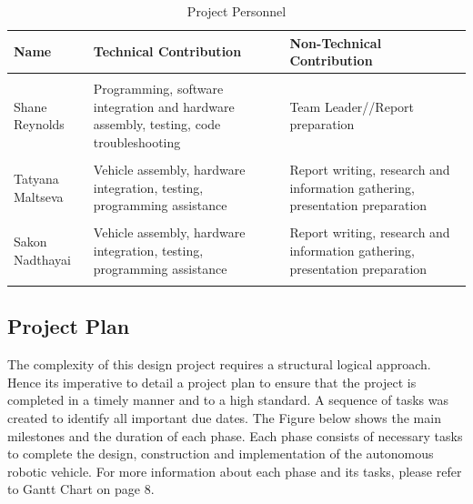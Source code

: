\documentclass[a4paper]{article}
\begin{document}
\begin{table}[h]
\centering
\caption{Project Personnel}
\small\begin{tabular}{lp{5cm}p{5cm}}
\toprule
\textbf{Name} & \textbf{Technical Contribution} & \textbf{Non-Technical Contribution}\\
\midrule
 & & \\
Shane Reynolds & Programming, software integration and hardware assembly, testing, code troubleshooting & Team Leader//Report preparation\\
 & & \\
Tatyana Maltseva & Vehicle assembly, hardware integration, testing, programming assistance & Report writing, research and information gathering, presentation preparation\\
 & & \\
Sakon Nadthayai & Vehicle assembly, hardware integration, testing, programming assistance & Report writing, research and information gathering, presentation preparation\\
& & \\
\bottomrule
\end{tabular}
\end{table}

\subsection{Project Plan}
The complexity of this design project requires a structural logical approach. Hence its imperative to detail a project plan to ensure that the project is completed in a timely manner and to a high standard. A sequence of tasks was created to identify all important due dates. The Figure below shows the main milestones and the duration of each phase. Each phase consists of necessary tasks to complete the design, construction and implementation of the autonomous robotic vehicle. For more information about each phase and its tasks, please refer to Gantt Chart on page 8.\\
\end{document}
